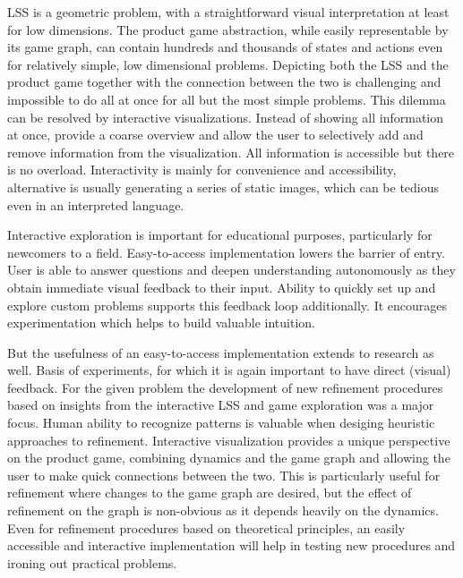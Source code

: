 LSS is a geometric problem, with a straightforward visual interpretation at least for low dimensions.
The product game abstraction, while easily representable by its game graph, can contain hundreds and thousands of states and actions even for relatively simple, low dimensional problems.
Depicting both the LSS and the product game together with the connection between the two is challenging and impossible to do all at once for all but the most simple problems.
This dilemma can be resolved by interactive visualizations.
Instead of showing all information at once, provide a coarse overview and allow the user to selectively add and remove information from the visualization.
All information is accessible but there is no overload.
Interactivity is mainly for convenience and accessibility, alternative is usually generating a series of static images, which can be tedious even in an interpreted language.

Interactive exploration is important for educational purposes, particularly for newcomers to a field.
Easy-to-access implementation lowers the barrier of entry.
User is able to answer questions and deepen understanding autonomously as they obtain immediate visual feedback to their input.
Ability to quickly set up and explore custom problems supports this feedback loop additionally.
It encourages experimentation which helps to build valuable intuition.

But the usefulness of an easy-to-access implementation extends to research as well.
Basis of experiments, for which it is again important to have direct (visual) feedback.
For the given problem the development of new refinement procedures based on insights from the interactive LSS and game exploration was a major focus.
Human ability to recognize patterns is valuable when desiging heuristic approaches to refinement.
Interactive visualization provides a unique perspective on the product game, combining dynamics and the game graph and allowing the user to make quick connections between the two.
This is particularly useful for refinement where changes to the game graph are desired, but the effect of refinement on the graph is non-obvious as it depends heavily on the dynamics.
Even for refinement procedures based on theoretical principles, an easily accessible and interactive implementation will help in testing new procedures and ironing out practical problems.

